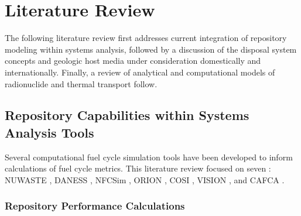 \chapter{Literature Review}
\label{ch:litrev}

The following literature review first addresses current integration of 
repository modeling within systems analysis, followed by a discussion of the 
disposal system concepts and geologic host media under consideration 
domestically and internationally.  Finally, a review of analytical and 
computational models of radionuclide and thermal transport follow. 

\section{Repository Capabilities within Systems Analysis Tools}
\label{sec:SA_repos}




Several computational fuel cycle simulation tools have been developed to inform 
calculations of fuel cycle metrics. This literature review focused on seven : 
\gls{NUWASTE} \cite{abkowitz_nuclear_2010},
\gls{DANESS} \cite{yacout_daness_2011,van_den_durpel_daness:_2006}, 
\gls{NFCSim} \cite{schneider_nfcsim_2004},
ORION \cite{gregg_orion_2011},
\gls{COSI} \cite{boucher_international_2010},
\gls{VISION} \cite{yacout_vision_2006, wilson_comparing_2011, 
radel_repository_2007, boucher_international_2010}, and
\gls{CAFCA} \cite{guerin_impact_2009}.

\subsection{Repository Performance Calculations}

